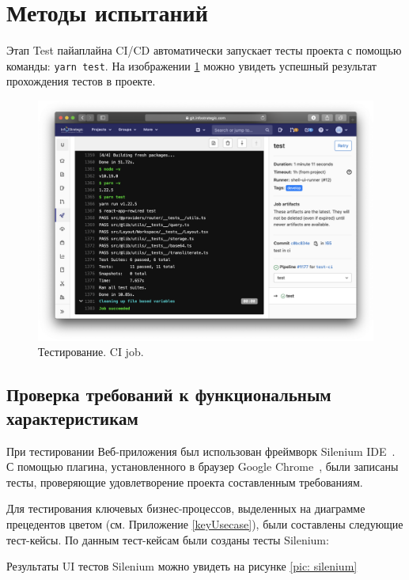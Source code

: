 \documentclass[a4paper,12pt,reqno]{article}
\begin{document}
	\newpage
	\section{Методы испытаний}
	
	Этап Test пайаплайна CI/CD автоматически запускает тесты проекта с помощью команды: \texttt{yarn test}. На изображении \ref{pic: test} можно увидеть успешный результат прохождения тестов в проекте.
	
	\begin{figure}[H]
		\centering
		\includegraphics[width = \linewidth]{img/test.png}
		\caption{Тестирование. CI job.}
		\label{pic: test}
	\end{figure}
	
	
	\subsection{Проверка требований к функциональным характеристикам}
	
	При тестировании Веб-приложения был использован фреймворк Silenium IDE~\cite{silenium}. С помощью плагина, установленного в браузер Google Chrome~\cite{chrome}, были записаны тесты, проверяющие удовлетворение проекта составленным требованиям.
	
	Для тестирования ключевых бизнес-процессов, выделенных на диаграмме прецедентов цветом (см. Приложение \ref{keyUsecase}), были составлены следующие тест-кейсы. По данным тест-кейсам были созданы тесты Silenium:
	
	
	
	Результаты UI тестов Silenium можно увидеть на рисунке \ref{pic: silenium}
	
\end{document}
